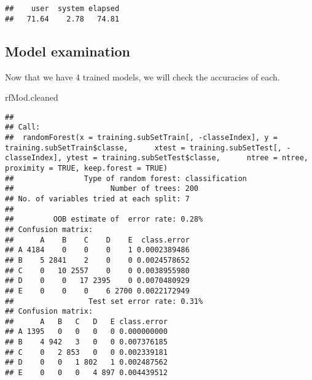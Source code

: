 \documentclass[]{article}
\newenvironment{Shaded}{\begin{snugshade}}{\end{snugshade}}
\newcommand{\CommentTok}[1]{\textcolor[rgb]{0.56,0.35,0.01}{\textit{#1}}}
\newcommand{\DataTypeTok}[1]{\textcolor[rgb]{0.13,0.29,0.53}{#1}}
\newcommand{\KeywordTok}[1]{\textcolor[rgb]{0.13,0.29,0.53}{\textbf{#1}}}
\newcommand{\NormalTok}[1]{#1}
\newcommand{\OperatorTok}[1]{\textcolor[rgb]{0.81,0.36,0.00}{\textbf{#1}}}
\newcommand{\OtherTok}[1]{\textcolor[rgb]{0.56,0.35,0.01}{#1}}
\newcommand{\StringTok}[1]{\textcolor[rgb]{0.31,0.60,0.02}{#1}}
\begin{document}
\begin{Shaded}
\end{Shaded}

\begin{verbatim}
##    user  system elapsed 
##   71.64    2.78   74.81
\end{verbatim}

\hypertarget{model-examination}{%
\subsection{Model examination}\label{model-examination}}

Now that we have 4 trained models, we will check the accuracies of each.

\begin{Shaded}
\begin{Highlighting}[]
\NormalTok{rfMod.cleaned}
\end{Highlighting}
\end{Shaded}

\begin{verbatim}
## 
## Call:
##  randomForest(x = training.subSetTrain[, -classeIndex], y = training.subSetTrain$classe,      xtest = training.subSetTest[, -classeIndex], ytest = training.subSetTest$classe,      ntree = ntree, proximity = TRUE, keep.forest = TRUE) 
##                Type of random forest: classification
##                      Number of trees: 200
## No. of variables tried at each split: 7
## 
##         OOB estimate of  error rate: 0.28%
## Confusion matrix:
##      A    B    C    D    E  class.error
## A 4184    0    0    0    1 0.0002389486
## B    5 2841    2    0    0 0.0024578652
## C    0   10 2557    0    0 0.0038955980
## D    0    0   17 2395    0 0.0070480929
## E    0    0    0    6 2700 0.0022172949
##                 Test set error rate: 0.31%
## Confusion matrix:
##      A   B   C   D   E class.error
## A 1395   0   0   0   0 0.000000000
## B    4 942   3   0   0 0.007376185
## C    0   2 853   0   0 0.002339181
## D    0   0   1 802   1 0.002487562
## E    0   0   0   4 897 0.004439512
\end{verbatim}
\end{document}

